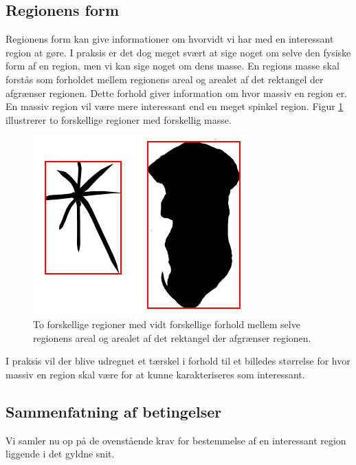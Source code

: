 {\subsection{Regionens form}
Regionens form kan give informationer om hvorvidt vi har med en
interessant region at gøre.  I praksis er det dog meget svært at sige
noget om selve den fysiske form af en region, men vi kan sige noget om
dens masse.  En regions masse skal forstås som forholdet mellem
regionens areal og arealet af det rektangel der afgrænser regionen.
Dette forhold giver information om hvor massiv en region er.  En massiv
region vil være mere interessant end en meget spinkel region.  Figur
\ref{region_mass} illustrerer to forskellige regioner med forskellig
masse.
\begin{figure}[h]
	\begin{center}
		\includegraphics[scale=\imgscale,angle=0]{afsnit/vores_implementation/billeder/naiv_algoritme/bbox_area_ratio}
	\end{center}
	\caption[Regioners masse]{To forskellige regioner med vidt forskellige forhold
	mellem selve regionens areal og arealet af det rektangel der
	afgrænser regionen.}
	\label{region_mass}
\end{figure}
I praksis vil der blive udregnet et tærskel i forhold til et billedes
størrelse for hvor massiv en region skal være for at kunne
karakteriseres som interessant.

\subsection{Sammenfatning af betingelser}
Vi samler nu op på de ovenstående krav for bestemmelse af en interessant
region liggende i det gyldne snit.

}
